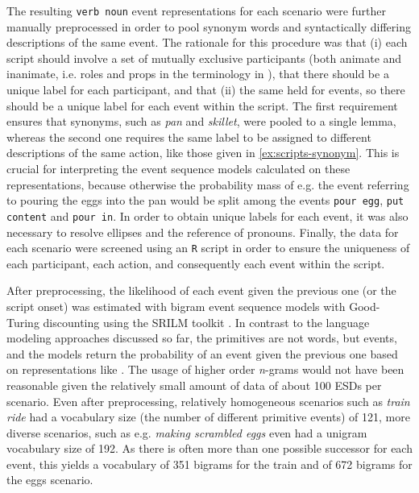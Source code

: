 The resulting \texttt{verb noun} event representations for each scenario were further manually preprocessed in order to pool synonym words and syntactically differing descriptions of the same event. The rationale for this procedure was that (i) each script should involve a set of mutually exclusive participants (both animate and inanimate, i.e. roles and props in the terminology in \citet{schank.abelson1977}), that there should be a unique label for each participant, and that (ii) the same held for events, so there should be a unique label for each event within the script. The first requirement ensures that synonyms, such as \textit{pan} and \textit{skillet}, were pooled to a single lemma, whereas the second one requires the same label to be assigned to different descriptions of the same action, like those given in \ref{ex:scripts-synonym}. This is crucial for interpreting the event sequence models calculated on these representations, because otherwise the probability mass of e.g. the event referring to pouring the eggs into the pan would be split among the events \texttt{pour egg}, \texttt{put content} and \texttt{pour in}. In order to obtain unique labels for each event, it was also necessary to resolve ellipses and the reference of pronouns. Finally, the data for each scenario were screened using an \texttt{R} script in order to ensure the uniqueness of each participant, each action, and consequently each event within the script.

After preprocessing, the likelihood of each event given the previous one (or the script onset) was estimated with bigram event sequence models with Good-Turing discounting using the SRILM toolkit \citep{stolcke2002}.  In contrast to the language modeling approaches discussed so far, the primitives are not words, but events, and the models return the probability of an event given the previous one based on representations like \Last. The usage of higher order \textit{n}-grams would not have been reasonable given the relatively small amount of data of about 100 ESDs per scenario. Even after preprocessing, relatively homogeneous scenarios such as \textit{train ride} had a vocabulary size (the number of different primitive events) of 121, more diverse scenarios, such as e.g. \textit{making scrambled eggs} even had a unigram vocabulary size of 192. As there is often more than one possible successor for each event, this yields a vocabulary of 351 bigrams for the train and of 672 bigrams for the eggs scenario.

